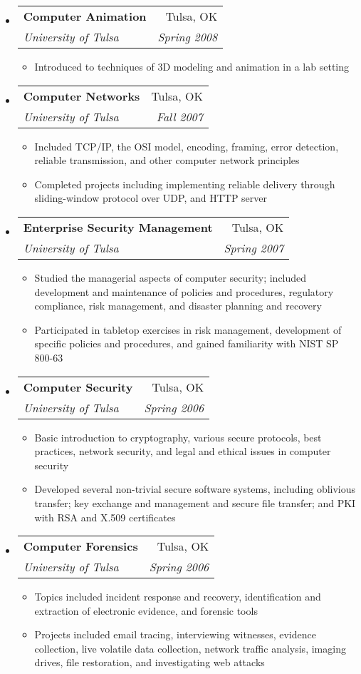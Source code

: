\documentclass[letterpaper,11pt]{article}
\makeatletter
\newcommand{\resitem}[1]{\item #1 \vspace{-2pt}}
\newcommand{\ressubheading}[4]{
\begin{tabular*}{6.5in}{l@{\extracolsep{\fill}}r}
		\textbf{#1} & #2 \\
		\textit{#3} & \textit{#4} \\
\end{tabular*}\vspace{-6pt}}
\makeatother
\begin{document}
\begin{itemize}
\item
	\ressubheading{Computer Animation}{Tulsa, OK}{University of Tulsa}{Spring 2008}
	\begin{itemize}
		\resitem{Introduced to techniques of 3D modeling and animation in a lab setting}
	\end{itemize}
\item
	\ressubheading{Computer Networks}{Tulsa, OK}{University of Tulsa}{Fall 2007}
	\begin{itemize}
		\resitem{Included TCP/IP, the OSI model, encoding, framing, error detection, reliable transmission, and other computer network principles}
		\resitem{Completed projects including implementing reliable delivery through sliding-window protocol over UDP, and HTTP server}
	\end{itemize}
\item
	\ressubheading{Enterprise Security Management}{Tulsa, OK}{University of Tulsa}{Spring 2007}
	\begin{itemize}
		\resitem{Studied the managerial aspects of computer security; included development and maintenance of policies and procedures, regulatory compliance, risk management, and disaster planning and recovery}
		\resitem{Participated in tabletop exercises in risk management, development of specific policies and procedures, and gained familiarity with NIST SP 800-63}
	\end{itemize}
\item
	\ressubheading{Computer Security}{Tulsa, OK}{University of Tulsa}{Spring 2006}
	\begin{itemize}
		\resitem{Basic introduction to cryptography, various secure protocols, best practices, network security, and legal and ethical issues in computer security}
		\resitem{Developed several non-trivial secure software systems, including oblivious transfer; key exchange and management and secure file transfer; and PKI with RSA and X.509 certificates}
	\end{itemize}
\item
	\ressubheading{Computer Forensics}{Tulsa, OK}{University of Tulsa}{Spring 2006}
	\begin{itemize}
		\resitem{Topics included incident response and recovery, identification and extraction of electronic evidence, and forensic tools}
		\resitem{Projects included email tracing, interviewing witnesses, evidence collection, live volatile data collection, network traffic analysis, imaging drives, file restoration, and investigating web attacks}
	\end{itemize}
\end{itemize}
\end{document}
